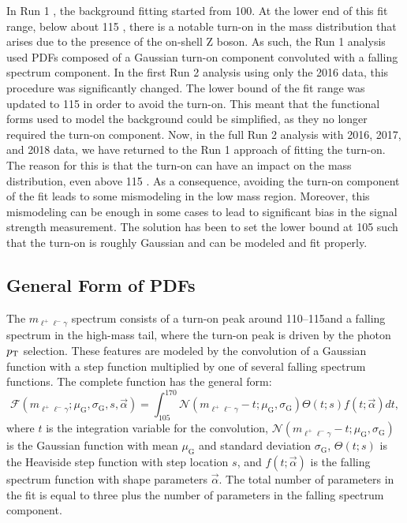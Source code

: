 In Run 1 \cite{CMS-PAS-HIG-13-006}, the background fitting started from 100\GeV. 
At the lower end of this fit range, below about 115 \GeV, there is a notable turn-on in the mass distribution that arises due to the 
presence of the on-shell Z boson. As such, the Run 1 analysis used PDFs composed of a Gaussian turn-on component convoluted 
with a falling spectrum component. In the first Run 2 analysis using only the 2016 data, this procedure was significantly changed.
The lower bound of the fit range was updated to 115 \GeV in order to avoid the turn-on. This meant that the functional forms used
to model the background could be simplified, as they no longer required the turn-on component. Now, in the full Run 2 analysis with 
2016, 2017, and 2018 data, we have returned to the Run 1 approach of fitting the turn-on. The reason for this is that the turn-on can have an impact on 
the mass distribution, even above 115 \GeV. As a consequence, avoiding the turn-on component of the fit leads to some mismodeling in the 
low mass region. Moreover, this mismodeling can be enough in some cases to lead to significant bias in the signal strength measurement. 
The solution has been to set the lower bound at 105 \GeV such that the turn-on is roughly Gaussian and can be modeled and fit properly.

\subsection{General Form of PDFs}
The $m_{\ell^+\ell^-\gamma}$ spectrum consists of a turn-on peak around 110--115\GeV and a falling spectrum in the high-mass tail, where the turn-on peak is driven by the photon $p_{\mathrm{T}}$ selection. 
These features are modeled by the convolution of a Gaussian function with a step function multiplied by one of several falling spectrum functions.
The complete function has the general form:
\begin{equation}
    \mathcal{F}(m_{\ell^+\ell^-\gamma}; \mu_{\mathrm{G}}, \sigma_{\mathrm{G}}, s, \vec{\alpha}) = \int_{105}^{170}\mathcal{N}(m_{\ell^+\ell^-\gamma}-t;\mu_{\mathrm{G}},\sigma_{\mathrm{G}})\Theta(t; s)f(t; \vec{\alpha})dt,
\end{equation}
where $t$ is the integration variable for the convolution, $\mathcal{N}(m_{\ell^+\ell^-\gamma}-t;\mu_{\mathrm{G}},\sigma_{\mathrm{G}})$ is the Gaussian function with mean $\mu_{\mathrm{G}}$ and standard deviation $\sigma_{\mathrm{G}}$, $\Theta(t; s)$ is the Heaviside step function with step location $s$, and $f(t; \vec{\alpha})$ is the falling spectrum function with shape parameters $\vec{\alpha}$.
The total number of parameters in the fit is equal to three plus the number of parameters 
in the falling spectrum component.

